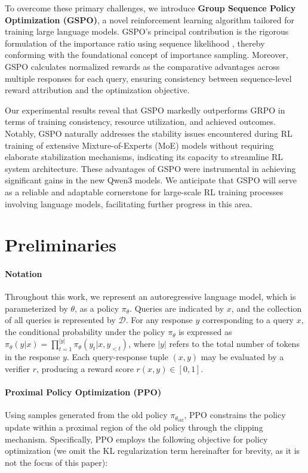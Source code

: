 To overcome these primary challenges, we introduce \textbf{Group Sequence Policy Optimization (GSPO)}, a novel reinforcement learning algorithm tailored for training large language models. GSPO's principal contribution is the rigorous formulation of the importance ratio using sequence likelihood \citep{click}, thereby conforming with the foundational concept of importance sampling. Moreover, GSPO calculates normalized rewards as the comparative advantages across multiple responses for each query, ensuring consistency between sequence-level reward attribution and the optimization objective.

Our experimental results reveal that GSPO markedly outperforms GRPO in terms of training consistency, resource utilization, and achieved outcomes. Notably, GSPO naturally addresses the stability issues encountered during RL training of extensive Mixture-of-Experts (MoE) models without requiring elaborate stabilization mechanisms, indicating its capacity to streamline RL system architecture. These advantages of GSPO were instrumental in achieving significant gains in the new Qwen3 models. We anticipate that GSPO will serve as a reliable and adaptable cornerstone for large-scale RL training processes involving language models, facilitating further progress in this area.

\section{Preliminaries}

\paragraph{Notation}
Throughout this work, we represent an autoregressive language model, which is parameterized by $\theta$, as a policy $\pi_\theta$. Queries are indicated by $x$, and the collection of all queries is represented by $\mathcal{D}$. For any response $y$ corresponding to a query $x$, the conditional probability under the policy $\pi_\theta$ is expressed as $\pi_\theta (y | x)=\prod_{t=1}^{|y|} \pi_\theta (y_t | x, y_{<t} )$, where $|y|$ refers to the total number of tokens in the response $y$. Each query-response tuple $(x, y)$ may be evaluated by a verifier $r$, producing a reward score $r(x, y) \in [ 0, 1 ]$.

\paragraph{Proximal Policy Optimization (PPO)} Using samples generated from the old policy $\pi_{\theta_\text{old}}$, PPO \citep{ppo} constrains the policy update within a proximal region of the old policy through the clipping mechanism. Specifically, PPO employs the following objective for policy optimization (we omit the KL regularization term hereinafter for brevity, as it is not the focus of this paper):

